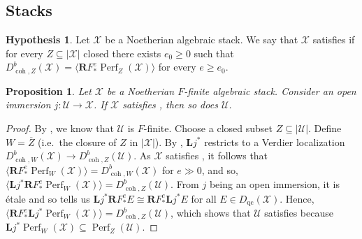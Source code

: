 \documentclass[11pt]{amsart}
\theoremstyle{plain}
\newtheorem{proposition}[theorem]{Proposition}
\theoremstyle{definition}
\newtheorem{hypothesis}[theorem]{Hypothesis}
\numberwithin{equation}{section}
\numberwithin{theorem}{section}
\begin{document}
\subsection{Stacks}
\label{sec:frob_gen_stacks}

\begin{hypothesis}
    \label{hyp:frob_gen}
    Let $\mathcal{X}$ be a Noetherian algebraic stack. 
    We say that $\mathcal{X}$ satisfies  if for every $Z\subseteq |\mathcal{X}|$ closed there exists $e_0 \geq 0$ such that $D^b_{\operatorname{coh},Z}(\mathcal{X})= \langle \mathbf{R} F_\ast^e \operatorname{Perf}_Z (\mathcal{X}) \rangle$ for every $e\geq e_0$. 
\end{hypothesis}

\begin{proposition}
    \label{prop:open_immersion}
    Let $\mathcal{X}$ be a Noetherian $F$-finite algebraic stack. 
    Consider an open immersion $j\colon \mathcal{U} \to \mathcal{X}$. 
    If $\mathcal{X}$ satisfies , then so does $\mathcal{U}$.
\end{proposition}

\begin{proof}
    By , we know that $\mathcal{U}$ is $F$-finite. 
    Choose a closed subset $Z\subseteq |\mathcal{U}|$. 
    Define $W= \overline{Z}$ (i.e.\ the closure of $Z$ in $|\mathcal{X}|$). 
    By , $\mathbf{L} j^\ast$ restricts to a Verdier localization $D^b_{\operatorname{coh},W}(\mathcal{X}) \to D^b_{\operatorname{coh},Z}(\mathcal{U})$. 
    As $\mathcal{X}$ satisfies , it follows that $\langle \mathbf{R} F^e_\ast \operatorname{Perf}_W (\mathcal{X}) \rangle = D^b_{\operatorname{coh},W}(\mathcal{X})$ for $e\gg 0$, and so, $\langle \mathbf{L} j^\ast  \mathbf{R} F^e_\ast \operatorname{Perf}_W (\mathcal{X}) \rangle = D^b_{\operatorname{coh},Z}(\mathcal{U})$. 
    From $j$ being an open immersion, it is \'{e}tale and so  tells us $\mathbf{L} j^\ast \mathbf{R} F^e_\ast E \cong \mathbf{R} F_\ast^e \mathbf{L} j^\ast E$ for all $E\in D_{\operatorname{qc}}(\mathcal{X})$. 
    Hence, $\langle \mathbf{R} F^e_\ast \mathbf{L} j^\ast \operatorname{Perf}_W (\mathcal{X}) \rangle = D^b_{\operatorname{coh},Z}(\mathcal{U})$, which shows that $\mathcal{U}$ satisfies  because $\mathbf{L} j^\ast \operatorname{Perf}_W (\mathcal{X}) \subseteq \operatorname{Perf}_Z (\mathcal{U})$.
\end{proof}
\end{document}
